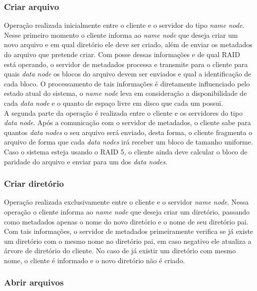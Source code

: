 \subsubsection{Criar arquivo}

Operação realizada inicialmente entre o cliente e o servidor do tipo \textit{name node}. Nesse primeiro momento o cliente informa ao \textit{name node} que deseja criar um novo arquivo e em qual diretório ele deve ser criado, além de enviar os metadados do arquivo que pretende criar. Com posse dessas informações e de qual RAID está operando, o servidor de metadados processa e transmite para o cliente para quais \textit{data node} os blocos do arquivo devem ser enviados e qual a identificação de cada bloco. O processamento de tais informações é diretamente influenciado pelo estado atual do sistema, o \textit{name node} leva em consideração a disponibilidade de cada \textit{data node} e o quanto de espaço livre em disco que cada um possui.
\\

A segunda parte da operação é realizada entre o cliente e os servidores do tipo \textit{data node}. Após a comunicação com o servidor de metadados, o cliente sabe para quantos \textit{data nodes} o seu arquivo será enviado, desta forma, o cliente fragmenta o arquivo de forma que cada \textit{data nodes} irá receber um bloco de tamanho uniforme. Caso o sistema esteja usando o RAID 5, o cliente ainda deve calcular o bloco de paridade do arquivo e enviar para um dos \textit{data nodes}.
\\

\subsubsection{Criar diretório}

Operação realizada exclusivamente entre o cliente e o servidor \textit{name node}. Nessa operação o cliente informa ao \textit{name node} que deseja criar um diretório, passando como metadados apenas o nome do novo diretório e o nome de seu diretório pai. Com tais informações, o servidor de metadados primeiramente verifica se já existe um diretório com o mesmo nome no diretório pai, em caso negativo ele atualiza a árvore de diretório do cliente. No caso de já existir um diretório com mesmo nome, o cliente é informado e o novo diretório não é criado.
\\

\subsubsection{Abrir arquivos}

